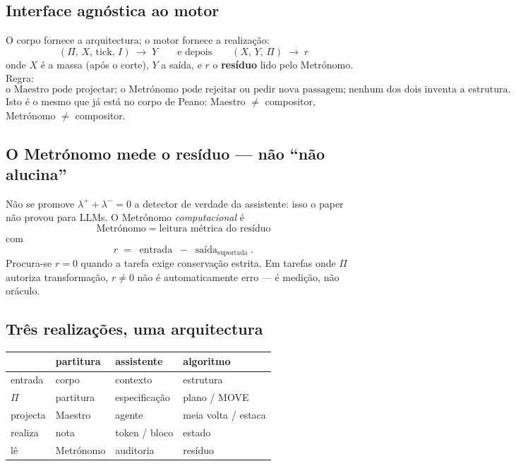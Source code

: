 \documentclass[11pt,a4paper]{article}
\begin{document}
\subsection*{Interface agnóstica ao motor}

O corpo fornece a arquitectura; o motor fornece a realização:
\[
\boxed{
(\Pi,\,X,\,\mathrm{tick},\,I)
\;\longrightarrow\;
Y
}
\qquad\text{e depois}\qquad
\boxed{
(X,\,Y,\,\Pi)
\;\longrightarrow\;
r
}
\]
onde $X$ é a massa (após o corte), $Y$ a saída, e $r$ o \textbf{resíduo} lido pelo Metrónomo.
Regra:
\[
\boxed{
\text{o Maestro pode projectar; o Metrónomo pode rejeitar ou pedir nova passagem;}
\;
\text{nenhum dos dois inventa a estrutura.}
}
\]
Isto é o mesmo que já está no corpo de Peano: Maestro $\neq$ compositor, Metrónomo $\neq$
compositor.

\subsection*{O Metrónomo mede o resíduo --- não ``não alucina''}

Não se promove $\lambda^{+}+\lambda^{-}=0$ a detector de verdade da assistente: isso o paper não
provou para LLMs. O Metrónomo \emph{computacional} é
\[
\boxed{
\text{Metrónomo}
\;=\;
\text{leitura métrica do resíduo}
}
\]
com
\[
  r
  \;=\;
  \operatorname{entrada}
  \;-\;
  \operatorname{saída}_{\mathrm{suportada}}.
\]
Procura-se $r=0$ quando a tarefa exige conservação estrita. Em tarefas onde $\Pi$ autoriza
transformação, $r\neq0$ não é automaticamente erro --- é medição, não oráculo.

\subsection*{Três realizações, uma arquitectura}

\begin{center}\small
\begin{tabular}{@{}llll@{}}
\toprule
 & partitura & assistente & algoritmo \\
\midrule
entrada & corpo & contexto & estrutura \\
$\Pi$ & partitura & especificação & plano / MOVE \\
projecta & Maestro & agente & meia volta / estaca \\
realiza & nota & token / bloco & estado \\
lê & Metrónomo & auditoria & resíduo \\
\bottomrule
\end{tabular}
\end{center}
\end{document}

